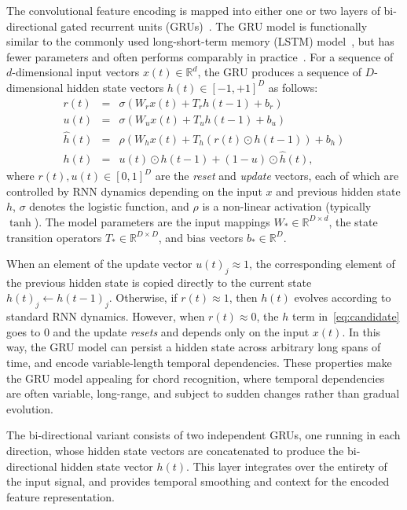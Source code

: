 \documentclass{article}
\begin{document}
The convolutional feature encoding is mapped into either one or two layers of bi-directional gated recurrent units (GRUs)~\cite{cho2014learning}.
The GRU model is functionally similar to the commonly used long-short-term memory (LSTM) model~\cite{hochreiter1997long}, but has fewer parameters and often performs comparably in practice~\cite{jozefowicz2015empirical}.
For a sequence of $d$-dimensional input vectors $x(t) \in \mathbb{R}^d$, the GRU produces a sequence of $D$-dimensional hidden state vectors $h(t) \in [-1, +1]^D$ as follows:
\begin{eqnarray}
    r(t) &=& \sigma\left(W_r x(t) + T_r h(t-1) + b_r\right)\\
    u(t) &=& \sigma\left(W_u x(t) + T_u h(t-1) + b_u\right)\\
    \hat{h}(t) &=& \rho\left(W_h x(t) + T_h \left( r(t) \odot h(t-1) \right) + b_h \right)\label{eq:candidate}\\
    h(t) &=& u(t) \odot h(t-1) + (1-u) \odot \hat{h}(t),
\end{eqnarray}
where $r(t), u(t) \in [0,1]^D$ are the \emph{reset} and \emph{update} vectors, each of which are controlled by RNN dynamics depending on the input $x$ and previous hidden state $h$, $\sigma$ denotes the logistic function, and $\rho$ is a non-linear activation (typically $\tanh$).
The model parameters are the input mappings $W_* \in \mathbb{R}^{D\times d}$, the state transition operators $T_* \in \mathbb{R}^{D\times D}$, and bias vectors $b_* \in \mathbb{R}^D$.

When an element of the update vector ${u(t)}_j \approx 1$, the corresponding element of the previous hidden state is copied directly to the current state ${h(t)}_j \leftarrow {h(t-1)}_j$.
Otherwise, if $r(t) \approx 1$, then $h(t)$ evolves according to standard RNN dynamics.
However, when $r(t) \approx 0$, the $h$ term in~\eqref{eq:candidate} goes to 0 and the update \emph{resets} and depends only on the input $x(t)$.
In this way, the GRU model can persist a hidden state across arbitrary long spans of time, and encode variable-length temporal dependencies.
These properties make the GRU model appealing for chord recognition, where temporal dependencies are often variable, long-range, and subject to sudden changes rather than gradual evolution.

The bi-directional variant consists of two independent GRUs, one running in each direction, whose hidden state vectors are concatenated to produce the bi-directional hidden state vector $h(t)$.
This layer integrates over the entirety of the input signal, and provides temporal smoothing and context for the encoded feature representation.
\end{document}
